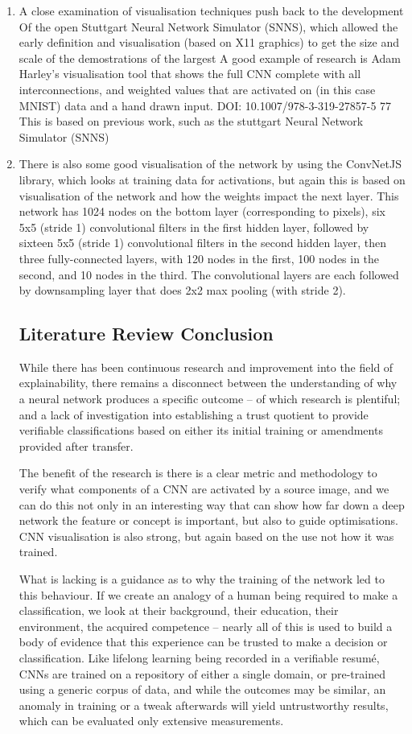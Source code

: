 \begin{enumerate}
    \item A close examination of visualisation techniques push back to the development Of the open Stuttgart Neural Network Simulator (SNNS), which allowed the early definition and visualisation (based on X11 graphics) to get the size and scale of the demostrations of the largest A good example of research is Adam Harley's visualisation tool that shows the full CNN complete with all interconnections, and weighted values that are activated on (in this case MNIST) data and a hand drawn input. DOI: 10.1007/978-3-319-27857-5 77  This is based on previous work, such as the stuttgart Neural Network Simulator (SNNS) 
    \item There is also some good visualisation of the network by using the ConvNetJS library, which looks at training data for activations, but again this is based on visualisation of the network and how the weights impact the next layer. This network has 1024 nodes on the bottom layer (corresponding to pixels), six 5x5 (stride 1) convolutional filters in the first hidden layer, followed by sixteen 5x5 (stride 1) convolutional filters in the second hidden layer, then three fully-connected layers, with 120 nodes in the first, 100 nodes in the second, and 10 nodes in the third. The convolutional layers are each followed by downsampling layer that does 2x2 max pooling (with stride 2). 

\subsection{Literature Review Conclusion}
While there has been continuous research and improvement into the field of explainability, there remains a disconnect between the understanding of why a neural network produces a specific outcome – of which research is plentiful; and a lack of investigation into establishing a trust quotient to provide verifiable classifications based on either its initial training or amendments provided after transfer.

The benefit of the research is there is a clear metric and methodology to verify what components of a CNN are activated by a source image, and we can do this not only in an interesting way that can show how far down a deep network the feature or concept is important, but also to guide optimisations. CNN visualisation is also strong, but again based on the use not how it was trained.

What is lacking is a guidance as to why the training of the network led to this behaviour. If we create an analogy of a human being required to make a classification, we look at their background, their education, their environment, the acquired competence – nearly all of this is used to build a body of evidence that this experience can be trusted to make a decision or classification. Like lifelong learning being recorded in a verifiable resumé, CNNs are trained on a repository of either a single domain, or pre-trained using a generic corpus of data, and while the outcomes may be similar, an anomaly in training or a tweak afterwards will yield untrustworthy results, which can be evaluated only extensive measurements.


\end{enumerate}
